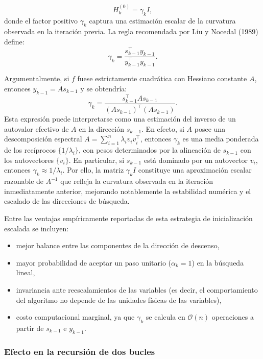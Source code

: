 \documentclass[
  spanish,
  us-letterpaper,
  DIV=11,
  numbers=noendperiod]{scrreprt}
\providecommand{\tightlist}{%
  \setlength{\itemsep}{0pt}\setlength{\parskip}{0pt}}
\numberwithin{equation}{section}
\begin{document}
\[
H_k^{(0)} = \gamma_k I,
\] donde el factor positivo \(\gamma_k\) captura una estimación escalar
de la curvatura observada en la iteración previa. La regla recomendada
por Liu y Nocedal (1989) define: \[
\gamma_k = \frac{s_{k-1}^{\top} y_{k-1}}{y_{k-1}^{\top} y_{k-1}}.
\]

Argumentalmente, si \(f\) fuese estrictamente cuadrática con Hessiano
constante \(A\), entonces \(y_{k-1} = A s_{k-1}\) y se obtendría: \[
\gamma_k
=
\frac{s_{k-1}^{\top} A s_{k-1}}
     {(A s_{k-1})^{\top} (A s_{k-1})}.
\] Esta expresión puede interpretarse como una estimación del inverso de
un autovalor efectivo de \(A\) en la dirección \(s_{k-1}\). En efecto,
si \(A\) posee una descomposición espectral
\(A = \sum_{i=1}^n \lambda_i v_i v_i^\top\), entonces \(\gamma_k\) es
una media ponderada de los recíprocos \(\{1/\lambda_i\}\), con pesos
determinados por la alineación de \(s_{k-1}\) con los autovectores
\(\{v_i\}\). En particular, si \(s_{k-1}\) está dominado por un
autovector \(v_i\), entonces \(\gamma_k \approx 1/\lambda_i\). Por ello,
la matriz \(\gamma_k I\) constituye una aproximación escalar razonable
de \(A^{-1}\) que refleja la curvatura observada en la iteración
inmediatamente anterior, mejorando notablemente la estabilidad numérica
y el escalado de las direcciones de búsqueda.

Entre las ventajas empíricamente reportadas de esta estrategia de
inicialización escalada se incluyen:

\begin{itemize}
\tightlist
\item
  mejor balance entre las componentes de la dirección de descenso,
\item
  mayor probabilidad de aceptar un paso unitario (\(\alpha_k = 1\)) en
  la búsqueda lineal,
\item
  invariancia ante reescalamientos de las variables (es decir, el
  comportamiento del algoritmo no depende de las unidades físicas de las
  variables),
\item
  costo computacional marginal, ya que \(\gamma_k\) se calcula en
  \(\mathcal{O}(n)\) operaciones a partir de \(s_{k-1}\) e \(y_{k-1}\).
\end{itemize}

\subsubsection{Efecto en la recursión de dos
bucles}\label{efecto-en-la-recursiuxf3n-de-dos-bucles}
\end{document}
